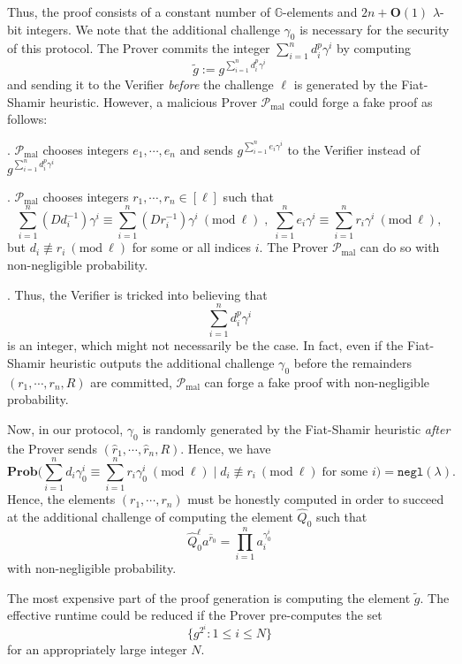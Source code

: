 \documentclass[11pt, lettersize, notitlepage, leqno, footskip=0.6cm]{article}
\newcommand{\pl}{\prod\limits}
\newcommand{\slim}{\sum\limits}
\newcommand{\ttt}{\texttt}
\newcommand{\negl}{\ttt{{negl}}}
\newcommand{\wti}{\widetilde}
\newcommand{\mc}{\mathcal}
\newcommand{\mb}{\mathbb}
\newcommand{\mbf}{\mathbf}
\newcommand{\mr}{\mathrm}
\newcommand{\lam}{\lambda}
\newcommand{\what}{\widehat}
\newcommand{\Prob}{\mbf{Prob}}
\newcommand{\bO}{\mbf{O}}
\newcommand{\mP}{\mc{P}}
\newcommand{\vs}{\vspace{-0.15cm}}
\newcommand{\noin}{\noindent}
\newcommand{\Mod}[1]{\ (\mathrm{mod}\ #1)}
\numberwithin{equation}{section}
\begin{document}
\vspace{0.2cm}

Thus, the proof consists of a constant number of $\mb{G}$-elements and $2n+\bO(1)$ $\lam$-bit integers. We note that the additional challenge $\gamma_0$ is necessary for the security of this protocol. The Prover commits the integer $\slim_{i=1}^n d_i^{p}\gamma^i$ by computing \vspace{-0.4cm} $$\wti{g} := g^{\slim_{i=1}^n d_i^{p}\gamma^i}$$ and sending it to the Verifier \textit{before} the challenge $\ell$ is generated by the Fiat-Shamir heuristic. However, a malicious Prover $\mP_{\mr{mal}}$ could forge a fake proof as follows:

\noin 1. $\mP_{\mr{mal}}$ chooses integers $e_1,\cdots,e_n$ and sends $g^{\slim_{i=1}^n e_i\gamma^i}$ to the Verifier instead of $g^{\slim_{i=1}^n d_i^{p}\gamma^i}$

\noin 2. $\mP_{\mr{mal}}$ chooses integers $r_1,\cdots,r_n\in [\ell]$ such that \vs $$\slim_{i=1}^n (Dd_i^{-1})\gamma^i \equiv \slim_{i=1}^n (Dr_i^{-1})\gamma^i \Mod{\ell}\;,\; \slim_{i=1}^n e_i\gamma^i\equiv \slim_{i=1}^n r_i\gamma^i \Mod{\ell},$$ but $d_i\not\equiv r_i\Mod{\ell}$ for some or all indices $i$. The Prover $\mP_{\mr{mal}}$ can do so  with non-negligible probability.

\noin 3. Thus, the Verifier is tricked into believing that \vs $$\slim_{i=1}^n d_i^{p}\gamma^i$$ is an integer, which  might not necessarily be the case. In fact, even if the Fiat-Shamir heuristic outputs the additional challenge $\gamma_0$ before the remainders $(r_1,\cdots,r_n, R)$ are committed, $\mP_{\mr{mal}}$ can forge a fake proof with non-negligible probability. 

Now, in our protocol, $\gamma_0$ is randomly generated by the Fiat-Shamir heuristic \textit{after} the Prover sends $(\what{r}_1,\cdots,\what{r}_n, R)$. Hence, we have \vs $$\Prob\Big(\slim_{i=1}^n d_i\gamma_0^i \equiv \slim_{i=1}^n r_i\gamma_0^i \Mod{\ell}\;\Big|\; d_i\not\equiv r_i\Mod{\ell}\;\text{for some } i\Big) = \negl(\lam). $$ Hence, the elements $(r_1,\cdots,r_n)$ must be honestly computed in order to succeed at the additional challenge of computing the element $\what{Q}_0$ such that \vs $$\what{Q}_0^{\ell}a^{\what{r}_0}= \pl_{i=1}^{n} a_i^{\gamma_0^i} $$ with non-negligible probability.

The most expensive part of the proof generation is computing the element $\wti{g}$. The effective runtime could be reduced if the Prover pre-computes the set \vs $$\{g^{2^i}: 1\leq i\leq N \} $$ for an appropriately large integer $N$.
\end{document}
